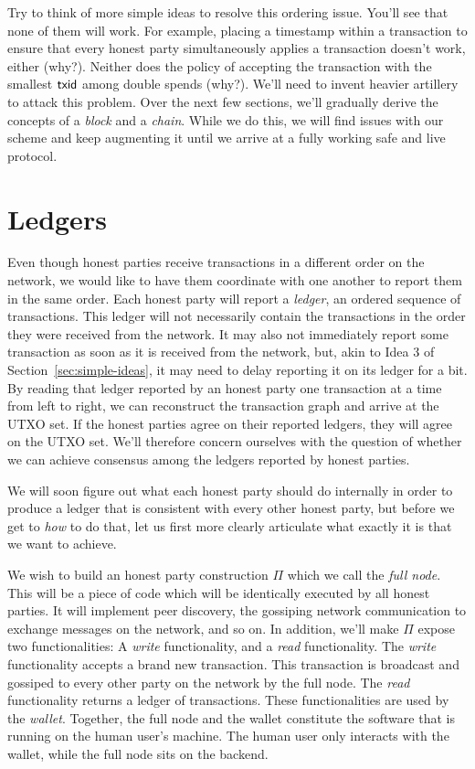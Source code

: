 Try to think of more simple ideas to resolve this ordering issue. You'll see that
none of them will work. For example, placing a timestamp within a transaction to ensure
that every honest party simultaneously applies a transaction doesn't work, either (why?).
Neither does the policy of accepting the transaction with the smallest $\mathsf{txid}$ among
double spends (why?).
We'll need to invent heavier artillery to attack this problem. Over the next few
sections, we'll gradually derive the concepts of a \emph{block} and a \emph{chain}.
While we do this, we will find issues with our scheme and keep augmenting it until
we arrive at a fully working safe and live protocol.

\section{Ledgers}

Even though honest parties receive transactions in a different order on the network,
we would like to have them coordinate with one another to report them in the same
order. Each honest party will report a \emph{ledger}, an ordered sequence of transactions.
This ledger will not necessarily contain the transactions in the order they were
received from the network. It may also not immediately report some transaction as
soon as it is received from the network, but, akin to Idea 3 of Section~\ref{sec:simple-ideas},
it may need to delay reporting it on its ledger for a bit.
By reading that ledger reported by an honest party one transaction at a time from left to right,
we can reconstruct the transaction graph and arrive at the UTXO set. If the honest parties
agree on their reported ledgers, they will agree on the UTXO set. We'll therefore concern
ourselves with the question of whether we can achieve consensus among the ledgers reported
by honest parties.

We will soon figure out what each honest party should do internally in order to produce
a ledger that is consistent with every other honest party, but before we get to \emph{how}
to do that, let us first more clearly articulate what exactly it is that we want to achieve.

We wish to build an honest party construction $\Pi$ which we call the \emph{full node}.
This will be a piece of code which will be identically executed by all honest parties.
It will implement peer discovery, the
gossiping network communication to exchange messages on the network, and so on. In
addition, we'll make $\Pi$ expose two functionalities: A
\emph{write} functionality, and a \emph{read} functionality. The \emph{write} functionality
accepts a brand new transaction. This transaction is
broadcast and gossiped to every other party on the network by the full node.
The \emph{read} functionality returns a ledger of transactions.
These functionalities are used by the \emph{wallet}. Together, the full node and
the wallet constitute the software that is running on the human user's machine.
The human user only interacts with the wallet, while the full node sits on the backend.

